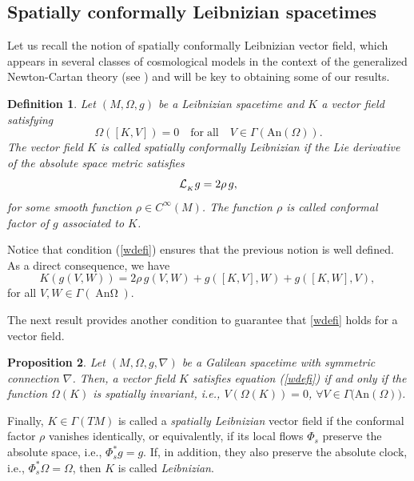 \documentclass[12pt]{article}
\DeclareMathOperator{\An}{\text{An}\Omega}
\newtheorem{defi}{Definition}[section]
\newtheorem{pro}[defi]{Proposition}
\begin{document}
\subsection{Spatially conformally Leibnizian spacetimes}
\label{sescls}
Let us recall the notion of spatially conformally Leibnizian vector field, which appears in several classes of cosmological models in the context of the generalized Newton-Cartan theory (see \cite{GGRW}) and will be key to obtaining some of our results.
\begin{defi}
Let $(M,\Omega,g)$ be a Leibnizian spacetime and $K$ a vector field satisfying 
\begin{equation}\label{wdefi}
\Omega([K,V])=0\quad\mathrm{for}\;\mathrm{all}\quad V\in\Gamma(\mathrm{An}(\Omega)).
\end{equation}
 The vector field $K$ is called \emph{spatially conformally Leibnizian} if the Lie derivative of the  absolute space metric satisfies
\begin{equation}\label{conforme}
{\cal L}_{_K}g=2\rho\,g,
\end{equation}
for some smooth function $\rho\in C^{\infty}(M)$. The function $\rho$ is called \textit{conformal factor} of $g$ associated to $K$.
\end{defi} 

Notice that condition (\ref{wdefi}) ensures that the previous notion is well defined. As a direct consequence, we have
\begin{equation}
K(g(V,W))=2\rho\,g(V,W)+g([K,V],W)+g([K,W],V),\,
\end{equation}
for all $V,W\in\Gamma(\An)$.

The next result provides another condition to guarantee that \eqref{wdefi} holds for a vector field.
\begin{pro}\label{pro:spatially invariant}
Let  $(M,\Omega,g,\nabla)$ be a Galilean spacetime with symmetric connection $\nabla$. Then, a vector field $K$ satisfies equation {\rm (\ref{wdefi})} if and only if the function $\Omega(K)$ is spatially invariant, i.e., $V(\Omega(K))=0$, $\forall V\in\Gamma\big(\mathrm{An}(\Omega)\big)$.
\end{pro}

Finally, $K\in \Gamma(TM)$ is called a {\it spatially Leibnizian} vector field if the conformal factor $\rho$ vanishes identically, or equivalently, if its local flows $\Phi_s$ preserve the absolute space, i.e.,  $\Phi_s^* g = g$. If, in addition, they also preserve the absolute clock, i.e., $\Phi_s^* \Omega = \Omega$, then $K$ is called \textit{Leibnizian}. 
\end{document}

